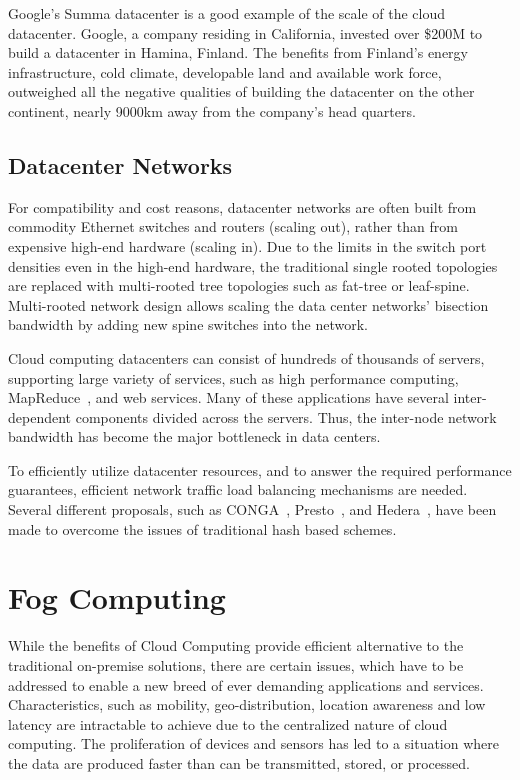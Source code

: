 Google's Summa datacenter is a good example of the scale of the cloud datacenter. Google, a company residing in California, invested over \$200M to build a datacenter in Hamina, Finland. The benefits from Finland's energy infrastructure, cold climate, developable land and available work force, outweighed all the negative qualities of building the datacenter on the other continent, nearly 9000km away from the company's head quarters.~\cite{Google:2016:Summa}

\subsection{Datacenter Networks}
For compatibility and cost reasons, datacenter networks are often built from commodity Ethernet switches and routers (scaling out), rather than from expensive high-end hardware (scaling in). Due to the limits in the switch port densities even in the high-end hardware, the traditional single rooted topologies are replaced with multi-rooted tree topologies such as fat-tree or leaf-spine. Multi-rooted network design allows scaling the data center networks' bisection bandwidth by adding new spine switches into the network.~\cite{Al-Fares:2010:SO, Al-Fares:2008:SCD}

Cloud computing datacenters can consist of hundreds of thousands of servers, supporting large variety of services, such as high performance computing, MapReduce~\cite{Dean:2008:MR}, and web services. Many of these applications have several inter-dependent components divided across the servers. Thus, the inter-node network bandwidth has become the major bottleneck in data centers.~\cite{Al-Fares:2008:SCD}

To efficiently utilize datacenter resources, and to answer the required performance guarantees, efficient network traffic load balancing mechanisms are needed. Several different proposals, such as CONGA~\cite{Alizadeh:2014:Conga},  Presto~\cite{He:2015:Presto}, and Hedera~\cite{Al-Fares:2010:Hedera}, have been made to overcome the issues of traditional hash based schemes.

\section{Fog Computing}
\label{section:fog-computing}

While the benefits of Cloud Computing provide efficient alternative to the traditional on-premise solutions, there are certain issues, which have to be addressed to enable a new breed of ever demanding applications and services. Characteristics, such as mobility, geo-distribution, location awareness and low latency are intractable to achieve due to the centralized nature of cloud computing. The proliferation of devices and sensors has led to a situation where the data are produced faster than can be transmitted, stored, or processed.~\cite{Bonomi:2012:Fog, Vaquero:2014:FYW}

